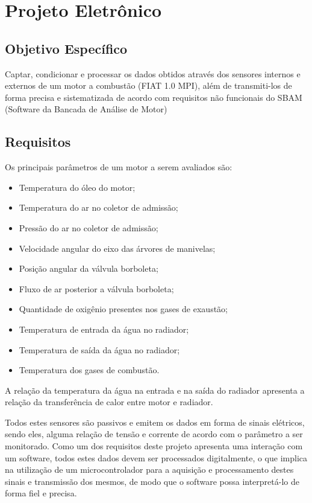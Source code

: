 \chapter[Projeto Eletrônico]{Projeto Eletrônico}

\section{Objetivo Específico}

Captar, condicionar e processar os dados obtidos através dos sensores internos e externos de um motor a combustão (FIAT 1.0 MPI), além de transmiti-los de forma precisa e sistematizada de acordo com requisitos não funcionais do SBAM (Software da Bancada de Análise de Motor)

\section{Requisitos}

Os principais parâmetros de um motor a serem avaliados são:

\begin{itemize}
	\item Temperatura do óleo do motor;
	\item Temperatura do ar no coletor de admissão;
	\item Pressão do ar no coletor de admissão;
	\item Velocidade angular do eixo das árvores de manivelas;
	\item Posição angular da válvula borboleta;
	\item Fluxo de ar posterior a válvula borboleta;
	\item Quantidade de oxigênio presentes nos gases de exaustão;
	\item Temperatura de entrada da água no radiador;
	\item Temperatura de saída da água no radiador;
	\item Temperatura dos gases de combustão.
\end{itemize}

A relação da temperatura da água na entrada e na saída do radiador apresenta a relação da transferência de calor entre motor e radiador.

Todos estes sensores são passivos e emitem os dados em forma de sinais elétricos, sendo eles, alguma relação de tensão e corrente de acordo com o parâmetro a ser monitorado. Como um dos requisitos deste projeto apresenta uma interação com um software, todos estes dados devem ser processados digitalmente, o que implica na utilização de um microcontrolador para a aquisição e processamento destes sinais e transmissão dos mesmos, de modo que o software possa interpretá-lo de forma fiel e precisa. 

